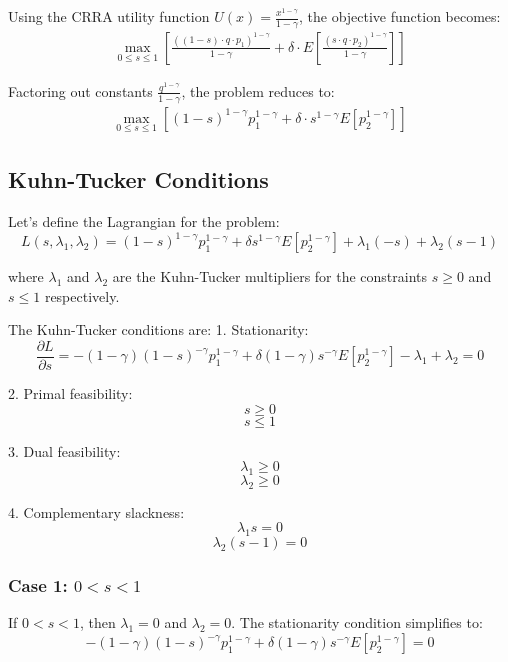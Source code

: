 \documentclass[12pt]{article}
\begin{document}
Using the CRRA utility function $U(x) = \frac{x^{1 - \gamma}}{1 - \gamma}$, the objective function becomes:
\begin{align*}
    \max_{0 \leq s \leq 1} \left[ \frac{(\left(1 - s\right) \cdot q \cdot p_1)^{1 - \gamma}}{1 - \gamma} + \delta \cdot E\left[\frac{(s \cdot q \cdot p_2)^{1 - \gamma}}{1 - \gamma}\right] \right]
\end{align*}

Factoring out constants $\frac{q^{1 - \gamma}}{1 - \gamma}$, the problem reduces to:
\begin{align}
    \max_{0 \leq s \leq 1} \left[ \left(1 - s\right)^{1 - \gamma} p_1^{1 - \gamma} + \delta \cdot s^{1 - \gamma} E[p_2^{1 - \gamma}] \right]
\end{align}

\subsection{Kuhn-Tucker Conditions}

Let's define the Lagrangian for the problem:
\begin{equation}
  L(s, \lambda_1, \lambda_2) = \left(1 - s\right)^{1 - \gamma} p_1^{1 - \gamma} + \delta s^{1 - \gamma} E[p_2^{1 - \gamma}] + \lambda_1 (-s) + \lambda_2 \left(s - 1\right)  
\end{equation}

where $\lambda_1$ and $\lambda_2$ are the Kuhn-Tucker multipliers for the constraints $ s \geq 0 $ and $ s \leq 1 $ respectively.

The Kuhn-Tucker conditions are:
1. Stationarity:
\[
\frac{\partial L}{\partial s} = -\left(1 - \gamma\right) \left(1 - s\right)^{-\gamma} p_1^{1 - \gamma} + \delta \left(1 - \gamma\right) s^{-\gamma} E[p_2^{1 - \gamma}] - \lambda_1 + \lambda_2 = 0
\]

2. Primal feasibility:
\[
s \geq 0
\]
\[
s \leq 1
\]

3. Dual feasibility:
\[
\lambda_1 \geq 0
\]
\[
\lambda_2 \geq 0
\]

4. Complementary slackness:
\[
\lambda_1 s = 0
\]
\[
\lambda_2 (s - 1) = 0
\]

\subsubsection*{Case 1: \(0 < s < 1\)}

If \(0 < s < 1\), then \(\lambda_1 = 0\) and \(\lambda_2 = 0\). The stationarity condition simplifies to:
\[
-(1 - \gamma) (1 - s)^{-\gamma} p_1^{1 - \gamma} + \delta (1 - \gamma) s^{-\gamma} E[p_2^{1 - \gamma}] = 0
\]
\end{document}
